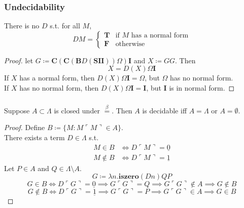 \documentclass[UTF8,11pt,colorlinks,compress,openany]{beamer}%
\begin{document}
\begin{frame}\frametitle{Undecidability}
	\begin{theorem}[Church1936]
		There is no $D$ s.t. for all $M$,
	\setlength\abovedisplayskip{0pt}
	\setlength\belowdisplayskip{0pt}
		\[DM=
		\begin{cases}
		\mathbf{T}&\text{if $M$ has a normal form}\\
		\mathbf{F}&\text{otherwise}
		\end{cases}\]
	\end{theorem}
	\begin{proof}
		let $G\coloneqq \mathbf{C}(\mathbf{C}(\mathbf{B}D(\mathbf{S}\mathbf{I}\mathbf{I}))\Omega)\mathbf{I}$ and $X\coloneqq GG$. Then
		\[X=D(X)\Omega\mathbf{I}\]
		If $X$ has a normal form, then $D(X)\Omega\mathbf{I}=\Omega$, but $\Omega$ has no normal form.\\
		If $X$ has no normal form, then $D(X)\Omega\mathbf{I}=\mathbf{I}$, but $\mathbf{I}$ is in normal form.
	\end{proof}
\end{frame}

\begin{frame}\frametitle{}
	\begin{theorem}
		Suppose $A\subset\Lambda$ is closed under $\stackrel{\beta}{=}$. Then $A$ is decidable iff $A=\Lambda$ or $A=\emptyset$.
	\end{theorem}
	\begin{proof}
		Define $B\coloneqq \{M: M\ulcorner M\urcorner\in A\}$.\\
		There exists a term $D\in\Lambda$ s.t.
		\begin{align*}
		M\in B&\iff D\ulcorner M\urcorner=\underline{0}\\
		M\notin B&\iff D\ulcorner M\urcorner=\underline{1}
		\end{align*}
		Let $P\in A$ and $Q\in\Lambda\setminus A$.
		\[G\coloneqq \lambda n.\mathbf{iszero}(Dn)QP\]
		\[G\in B\iff D\ulcorner G\urcorner=\underline{0}\implies G\ulcorner G\urcorner=Q\implies G\ulcorner G\urcorner\notin A\implies G\notin B\]
		\[G\notin B\iff D\ulcorner G\urcorner=\underline{1}\implies G\ulcorner G\urcorner=P\implies G\ulcorner G\urcorner\in A\implies G\in B\]
	\end{proof}
\end{frame}
\end{document}
